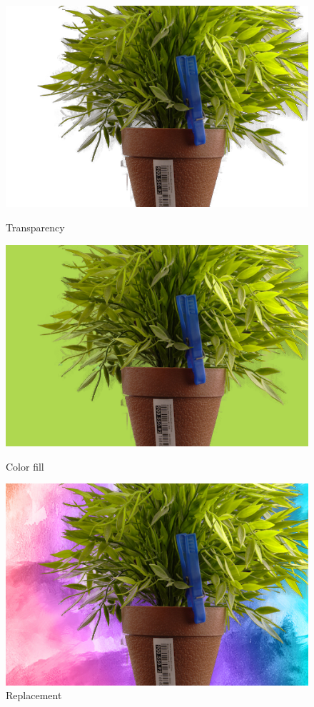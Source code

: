 \documentclass[a4paper]{article}
\begin{document}
\begin{figure}[h]
    \begin{minipage}{0.33\textwidth}
        \includegraphics[width=\textwidth]{result3.png}
        \caption{Transparency}
    \end{minipage}
    \begin{minipage}{0.33\textwidth}
        \includegraphics[width=\textwidth]{result2.png}
        \caption{Color fill}
    \end{minipage}
    \begin{minipage}{0.33\textwidth}
        \includegraphics[width=\textwidth]{result1.png}
        \caption{Replacement}
    \end{minipage}
\end{figure}
\end{document}
